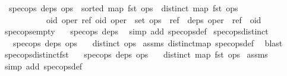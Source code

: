 \begin{isabellebody}
\ \ {\isachardoublequoteopen}spec{\isacharunderscore}ops\ deps\ ops\ {\isasymequiv}\ {\isacharparenleft}sorted\ {\isacharparenleft}map\ fst\ ops{\isacharparenright}\ {\isasymand}\ distinct\ {\isacharparenleft}map\ fst\ ops{\isacharparenright}\ {\isasymand}\isanewline
\ \ \ \ \ \ \ \ \ \ \ {\isacharparenleft}{\isasymforall}oid\ oper\ ref{\isachardot}\ {\isacharparenleft}oid{\isacharcomma}\ oper{\isacharparenright}\ {\isasymin}\ set\ ops\ {\isasymand}\ ref\ {\isasymin}\ deps\ oper\ {\isasymlongrightarrow}\ ref\ {\isacharless}\ oid{\isacharparenright}{\isacharparenright}{\isachardoublequoteclose}\isanewline
\isanewline
{}\isamarkupfalse%
\ spec{\isacharunderscore}ops{\isacharunderscore}empty{\isacharcolon}\isanewline
\ \ \ {\isachardoublequoteopen}spec{\isacharunderscore}ops\ deps\ {\isacharbrackleft}{\isacharbrackright}{\isachardoublequoteclose}\isanewline
%
\isadelimproof
%
\endisadelimproof
%
\isatagproof
{}\isamarkupfalse%
\ {\isacharparenleft}simp\ add{\isacharcolon}\ spec{\isacharunderscore}ops{\isacharunderscore}def{\isacharparenright}%
\endisatagproof
{\isafoldproof}%
%
\isadelimproof
\isanewline
%
\endisadelimproof
\isanewline
{}\isamarkupfalse%
\ spec{\isacharunderscore}ops{\isacharunderscore}distinct{\isacharcolon}\isanewline
\ \ \ {\isachardoublequoteopen}spec{\isacharunderscore}ops\ deps\ ops{\isachardoublequoteclose}\isanewline
\ \ \ {\isachardoublequoteopen}distinct\ ops{\isachardoublequoteclose}\isanewline
%
\isadelimproof
%
\endisadelimproof
%
\isatagproof
{}\isamarkupfalse%
\ assms\ distinct{\isacharunderscore}map\ spec{\isacharunderscore}ops{\isacharunderscore}def\ \isamarkupfalse%
\ blast%
\endisatagproof
{\isafoldproof}%
%
\isadelimproof
\isanewline
%
\endisadelimproof
\isanewline
{}\isamarkupfalse%
\ spec{\isacharunderscore}ops{\isacharunderscore}distinct{\isacharunderscore}fst{\isacharcolon}\isanewline
\ \ \ {\isachardoublequoteopen}spec{\isacharunderscore}ops\ deps\ ops{\isachardoublequoteclose}\isanewline
\ \ \ {\isachardoublequoteopen}distinct\ {\isacharparenleft}map\ fst\ ops{\isacharparenright}{\isachardoublequoteclose}\isanewline
%
\isadelimproof
%
\endisadelimproof
%
\isatagproof
{}\isamarkupfalse%
\ assms\ \isamarkupfalse%
\ {\isacharparenleft}simp\ add{\isacharcolon}\ spec{\isacharunderscore}ops{\isacharunderscore}def{\isacharparenright}%
\endisatagproof
{\isafoldproof}%
%
\isadelimproof
\isanewline
%
\endisadelimproof

\end{isabellebody}
